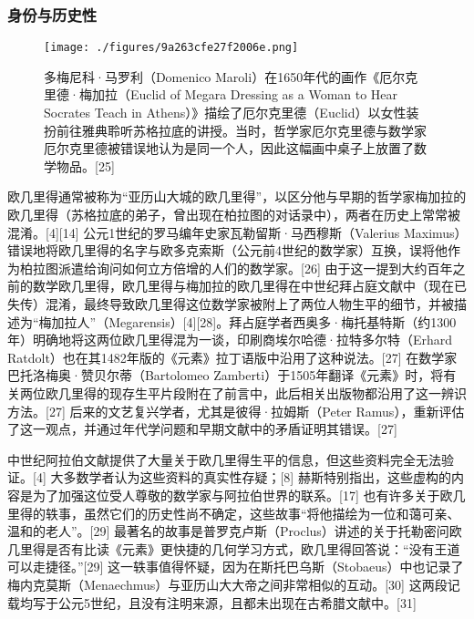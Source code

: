 \subsubsection{身份与历史性}
\begin{figure}[ht]
\centering
\texttt{[image: ./figures/9a263cfe27f2006e.png]}
\caption{多梅尼科·马罗利（Domenico Maroli）在1650年代的画作《厄尔克里德·梅加拉（Euclid of Megara Dressing as a Woman to Hear Socrates Teach in Athens）》描绘了厄尔克里德（Euclid）以女性装扮前往雅典聆听苏格拉底的讲授。当时，哲学家厄尔克里德与数学家厄尔克里德被错误地认为是同一个人，因此这幅画中桌子上放置了数学物品。[25]} \label{fig_Euclid_3}
\end{figure}
欧几里得通常被称为“亚历山大城的欧几里得”，以区分他与早期的哲学家梅加拉的欧几里得（苏格拉底的弟子，曾出现在柏拉图的对话录中），两者在历史上常常被混淆。[4][14] 公元1世纪的罗马编年史家瓦勒留斯·马西穆斯（Valerius Maximus）错误地将欧几里得的名字与欧多克索斯（公元前4世纪的数学家）互换，误将他作为柏拉图派遣给询问如何立方倍增的人们的数学家。[26] 由于这一提到大约百年之前的数学欧几里得，欧几里得与梅加拉的欧几里得在中世纪拜占庭文献中（现在已失传）混淆，最终导致欧几里得这位数学家被附上了两位人物生平的细节，并被描述为“梅加拉人”（Megarensis）[4][28]。拜占庭学者西奥多·梅托基特斯（约1300年）明确地将这两位欧几里得混为一谈，印刷商埃尔哈德·拉特多尔特（Erhard Ratdolt）也在其1482年版的《元素》拉丁语版中沿用了这种说法。[27] 在数学家巴托洛梅奥·赞贝尔蒂（Bartolomeo Zamberti）于1505年翻译《元素》时，将有关两位欧几里得的现存生平片段附在了前言中，此后相关出版物都沿用了这一辨识方法。[27] 后来的文艺复兴学者，尤其是彼得·拉姆斯（Peter Ramus），重新评估了这一观点，并通过年代学问题和早期文献中的矛盾证明其错误。[27]

中世纪阿拉伯文献提供了大量关于欧几里得生平的信息，但这些资料完全无法验证。[4] 大多数学者认为这些资料的真实性存疑；[8] 赫斯特别指出，这些虚构的内容是为了加强这位受人尊敬的数学家与阿拉伯世界的联系。[17] 也有许多关于欧几里得的轶事，虽然它们的历史性尚不确定，这些故事“将他描绘为一位和蔼可亲、温和的老人”。[29] 最著名的故事是普罗克卢斯（Proclus）讲述的关于托勒密问欧几里得是否有比读《元素》更快捷的几何学习方式，欧几里得回答说：“没有王道可以走捷径。”[29] 这一轶事值得怀疑，因为在斯托巴乌斯（Stobaeus）中也记录了梅内克莫斯（Menaechmus）与亚历山大大帝之间非常相似的互动。[30] 这两段记载均写于公元5世纪，且没有注明来源，且都未出现在古希腊文献中。[31]

